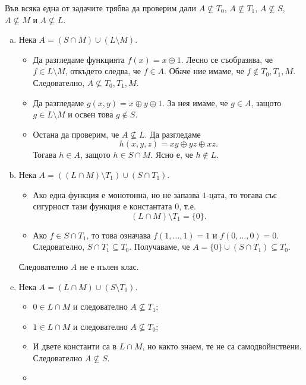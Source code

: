 \begin{solution}
  Във всяка една от задачите трябва да проверим дали
  $A \not\subseteq T_0$, 
  $A \not\subseteq T_1$, 
  $A \not\subseteq S$, 
  $A \not\subseteq M$ и 
  $A \not\subseteq L$.
  \begin{enumerate}[a)]
  \item 
    Нека $A = (S \cap M) \cup (L\setminus M)$.
    \begin{itemize}
    \item 
      Да разгледаме функцията 
      $f(x) = x \oplus 1$.
      Лесно се съобразява, че $f \in L\setminus M$, откъдето  следва, че $f \in A$.
      Обаче ние имаме, че $f \not\in T_0, T_1, M$.
      Следователно, $A \not\subseteq T_0, T_1, M$.
    \item
      Да разгледаме $g(x,y) = x\oplus y \oplus 1$.
      За нея имаме, че $g \in A$, защото $g \in L\setminus M$ и освен това $g \not\in S$.
    \item
      Остана да проверим, че $A \not\subseteq L$.
      Да разгледаме 
      \[h(x,y,z) = xy\oplus yz \oplus xz.\]
      Тогава $h \in A$, защото $h \in S\cap M$.
      Ясно е, че $h \not\in L$.
    \end{itemize}
  \item
    Нека $A = ((L\cap M)\setminus T_1)\cup (S\cap T_1)$.
    \begin{itemize}
    \item 
      Ако една функция е монотонна, но не запазва $1$-цата, то тогава 
      със сигурност тази функция е константата $0$, т.е.
      \[(L \cap M)\setminus T_1 = \{0\}.\]
    \item
      Ако $f \in S \cap T_1$, то това означава $f(1,\dots,1) = 1$ и $f(0,\dots,0) = 0$.
      Следователно, $S \cap T_1 \subseteq T_0$.
      Получаваме, че $A =  \{0\} \cup (S \cap T_1) \subseteq T_0$.
    \end{itemize}    
    Следователно $A$ не е пълен клас.
  \item
    Нека $A = (L\cap M)\cup (S\setminus T_0)$.
    \begin{itemize}
    \item
      $0 \in L \cap M$ и следователно $A \not\subseteq T_1$;
    \item
      $1 \in L \cap M$ и следователно $A \not\subseteq T_0$;
    \item
      И двете константи са в $L \cap M$, но както знаем, те  не са самодвойнствени.
      Следователно $A \not\subseteq S$.
    \item

\end{itemize}
\end{enumerate}
\end{solution}
